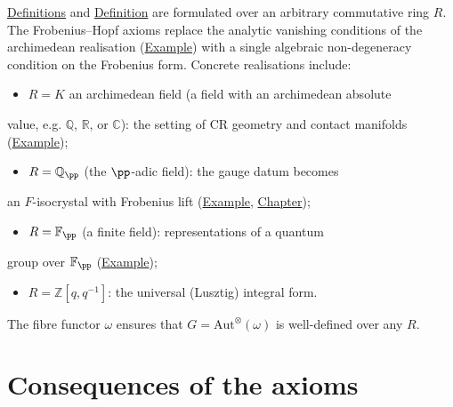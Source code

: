 \begin{remark}
  \label{rem:base-field-independence}
\hyperref[def:quantum-universe]{Definitions} and \hyperref[def:quantum-observable-universe]{Definition}
are formulated over an arbitrary commutative ring $R$. The Frobenius--Hopf axioms
replace the analytic vanishing conditions of the archimedean realisation
(\hyperref[def:c-quantum-observable-universe]{Example}) with a single algebraic
non-degeneracy condition on the Frobenius form. Concrete realisations
include:

\begin{itemize}
  \item $R = K$ an archimedean field (a field with an archimedean absolute
\end{itemize}
  value, e.g. $\mathbb{Q}$, $\mathbb{R}$, or $\mathbb{C}$): the
  setting of CR geometry and contact manifolds
  (\hyperref[def:c-quantum-universe]{Example});
\begin{itemize}
  \item $R = \mathbb{Q}_\pp$ (the $\pp$-adic field): the gauge datum becomes
\end{itemize}
  an $F$-isocrystal with Frobenius lift
  (\hyperref[ex:p-adic-realisation]{Example},
  \hyperref[chap:p-adic]{Chapter});
\begin{itemize}
  \item $R = \mathbb{F}_\pp$ (a finite field): representations of a quantum
\end{itemize}
  group over $\mathbb{F}_\pp$
  (\hyperref[ex:finite-field-realisation]{Example});
\begin{itemize}
  \item $R = \mathbb{Z}[q, q^{-1}]$: the universal (Lusztig) integral form.
\end{itemize}

The fibre functor $\omega$ ensures that $G = \mathrm{Aut}^{\otimes}(\omega)$
is well-defined over any $R$.
\end{remark}

\section{Consequences of the axioms}
\label{sec:axiom-consequences}

